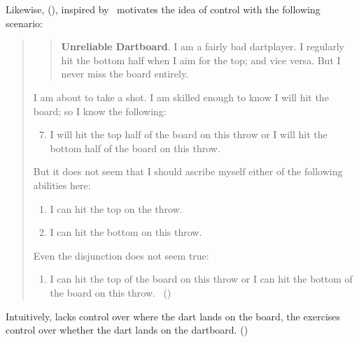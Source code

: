 \begin{note}
  Likewise, \citeauthor{Boylan:2020aa} (\citeyear{Boylan:2020aa}), inspired by~\textcite{Kenny:1976vh} motivates the idea of control with the following scenario:
  \begin{quote}
    \begin{quote}
      \textbf{Unreliable Dartboard}.
      I am a fairly bad dartplayer.
      I regularly hit the bottom half when I aim for the top; and vice versa.
      But I never miss the board entirely.
    \end{quote}
    I am about to take a shot.
    I am skilled enough to know I will hit the board; so I know the following:
    \begin{enumerate}[label=(\arabic*)]
      \setcounter{enumi}{6}
    \item
      I will hit the top half of the board on this throw or I will hit the bottom half of the board on this throw.
    \end{enumerate}
    But it does not seem that I should ascribe myself either of the following abilities here:
    \begin{enumerate}[label=(\arabic*), ref=(\arabic*), resume]
    \item
      I can hit the top on the throw.
    \item
      I can hit the bottom on this throw.
    \end{enumerate}
    Even the disjunction does not seem true:
    \begin{enumerate}[label=(\arabic*), ref=(\arabic*), resume]
    \item
      \label{Boylan:10}
      I can hit the top of the board on this throw or I can hit the bottom of the board on this throw.%
      \mbox{ }\hfill\mbox{(\citeyear[3]{Boylan:2020aa})}
    \end{enumerate}
  \end{quote}
  Intuitively, \citeauthor{Boylan:2020aa} lacks control over where the dart lands on the board, the exercises control over whether the dart lands on the dartboard.
  (\citeyear[\S2,19--20]{Boylan:2020aa})
\end{note}


